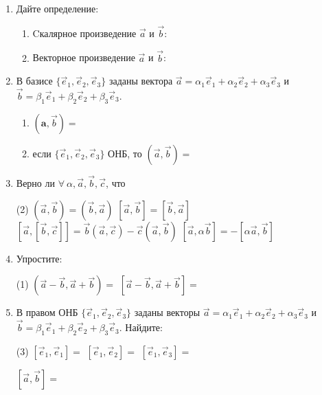 \begin{enumerate}
	\item Дайте определение:
	    \begin{enumerate}
	    	\item Cкалярное произведение $\vec a$ и $\vec b$:\ \hrulefill\par\hrulefill
	    	\item Векторное произведение $\vec a$ и $\vec b$:\ \hrulefill\par\hrulefill\par\hrulefill
	    \end{enumerate}

    \item
	В базисе $\{\vec e_1, \vec e_2, \vec e_3\}$ заданы вектора $\vec a = \alpha_1 \vec e_1 + \alpha_2 \vec e_2 + \alpha_3 \vec e_3$ и $\vec b = \beta_1 \vec e_1 + \beta_2 \vec e_2 + \beta_3 \vec e_3$.
 
	    \begin{enumerate}
	        \item $(\mathbf a, \vec b)= $ \ \hrulefill\par\hrulefill
	        \item если $\{\vec e_1, \vec e_2, \vec e_3\}$ ОНБ, то $(\vec a, \vec b)=$ \hrulefill
	    \end{enumerate}
    
    \item Верно ли $\forall\ \alpha, \vec a, \vec b, \vec c$, что
    \begin{tasks}(2)
    \task $(\vec a, \vec b) = (\vec b, \vec a)$
    \task $[\vec a, \vec b] = [\vec b, \vec a]$
    \task	$\left[{\vec  {a}},[{\vec  {b}},{\vec  {c}}]\right]={\vec  {b}}\left({\vec  {a}}, {\vec  {c}}\right)-{\vec  {c}}\left({\vec  {a}}, {\vec  {b}}\right)$
    \task $[\vec a, \alpha \vec b] = -[\alpha \vec a, \vec b]$
    \end{tasks}

   	\item Упростите:
   	\begin{tasks}(1)
    \task $(\vec a-\vec b, \vec a+\vec b) = $
    \task $[\vec a-\vec b, \vec a+\vec b] = $
    \end{tasks}

    
        
    \item В правом ОНБ $\{\vec e_1, \vec e_2, \vec e_3\}$ заданы векторы $\vec a = \alpha_1 \vec e_1 + \alpha_2 \vec e_2 + \alpha_3 \vec e_3$ и\\ ${\vec b = \beta_1 \vec e_1 + \beta_2 \vec e_2 + \beta_3 \vec e_3}$. Найдите:
        \begin{tasks}(3)
    		\task $[\vec e_1, \vec e_1]=$ 
    		\task $[\vec e_1, \vec e_2]=$
    		\task $[\vec e_1, \vec e_3]=$
   		 	\task \begin{minipage}[c]{4em}
   		 		\vspace{3em}
   		 		$[\vec a, \vec b]=$
   		 		\vspace{3em}
   		 	\end{minipage}
   		\end{tasks}
   		

\end{enumerate}

